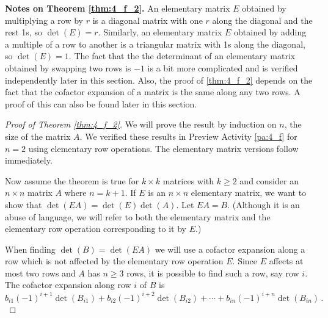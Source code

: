 \noindent \textbf{Notes on Theorem \ref{thm:4_f_2}.} An elementary matrix $E$ obtained by multiplying a row by $r$ is a diagonal matrix with one $r$ along the diagonal and the rest 1s, so $\det(E) = r$. Similarly, an elementary matrix $E$ obtained by adding a multiple of a row to another is a triangular matrix with 1s along the diagonal, so $\det(E) = 1$. The fact that the the determinant of an elementary matrix obtained by swapping two rows is $-1$ is a bit more complicated and is verified independently later in this section. Also, the proof of \ref{thm:4_f_2} depends on the fact that the cofactor expansion of a matrix is the same along any two rows. A proof of this can also be found later in this section.



\begin{proof}[Proof of Theorem \ref{thm:4_f_2}] 
We will prove the result by induction on $n$, the size of the matrix $A$. We verified these results in Preview Activity \ref{pa:4_f} for $n=2$ using elementary row operations. The elementary matrix versions follow immediately.

Now assume the theorem is true for $k\times k$ matrices with $k\geq 2$ and consider an $n\times n$ matrix $A$ where $n=k+1$. If $E$ is an $n\times n$ elementary matrix, we want to show that $\det(EA)=\det(E)\det(A)$. Let $EA=B$. (Although it is an abuse of language, we will refer to both the elementary matrix and the elementary row operation corresponding to it by $E$.)

When finding $\det(B)=\det(EA)$ we will use a cofactor expansion along a row which is not affected by the elementary row operation $E$. Since $E$ affects at most two rows and $A$ has $n\geq 3$ rows, it is possible to find such a row, say row $i$. The cofactor expansion along row $i$ of $B$ is 
\begin{equation}\label{eq:4_f_1}
b_{i1} (-1)^{i+1} \det(B_{i1}) + b_{i2} (-1)^{i+2} \det(B_{i2}) + \cdots + b_{in} (-1)^{i+n} \det(B_{in}) \, . 
\end{equation}


\end{proof}
